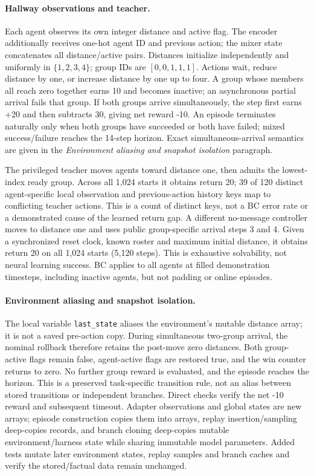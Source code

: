 \documentclass[10pt]{article}
\begin{document}
\paragraph{Hallway observations and teacher.}\label{app:local_clock} Each agent observes its own integer distance and active flag. The encoder additionally receives one-hot agent ID and previous action; the mixer state concatenates all distance/active pairs. Distances initialize independently and uniformly in $\{1,2,3,4\}$; group IDs are $[0,0,1,1,1]$. Actions wait, reduce distance by one, or increase distance by one up to four. A group whose members all reach zero together earns 10 and becomes inactive; an asynchronous partial arrival fails that group. If both groups arrive simultaneously, the step first earns +20 and then subtracts 30, giving net reward -10. An episode terminates naturally only when both groups have succeeded or both have failed; mixed success/failure reaches the 14-step horizon. Exact simultaneous-arrival semantics are given in the \emph{Environment aliasing and snapshot isolation} paragraph.

The privileged teacher moves agents toward distance one, then admits the lowest-index ready group. Across all 1,024 starts it obtains return 20; 39 of 120 distinct agent-specific local observation and previous-action history keys map to conflicting teacher actions. This is a count of distinct keys, not a BC error rate or a demonstrated cause of the learned return gap. A different no-message controller moves to distance one and uses public group-specific arrival steps 3 and 4. Given a synchronized reset clock, known roster and maximum initial distance, it obtains return 20 on all 1,024 starts (5,120 steps). This is exhaustive solvability, not neural learning success. BC applies to all agents at filled demonstration timesteps, including inactive agents, but not padding or online episodes.

\paragraph{Environment aliasing and snapshot isolation.}
The local variable \texttt{last\_state} aliases the environment's mutable distance array; it is not a saved pre-action copy. During simultaneous two-group arrival, the nominal rollback therefore retains the post-move zero distances. Both group-active flags remain false, agent-active flags are restored true, and the win counter returns to zero. No further group reward is evaluated, and the episode reaches the horizon. This is a preserved task-specific transition rule, not an alias between stored transitions or independent branches. Direct checks verify the net -10 reward and subsequent timeout. Adapter observations and global states are new arrays; episode construction copies them into arrays, replay insertion/sampling deep-copies records, and branch cloning deep-copies mutable environment/harness state while sharing immutable model parameters. Added tests mutate later environment states, replay samples and branch caches and verify the stored/factual data remain unchanged.
\end{document}
